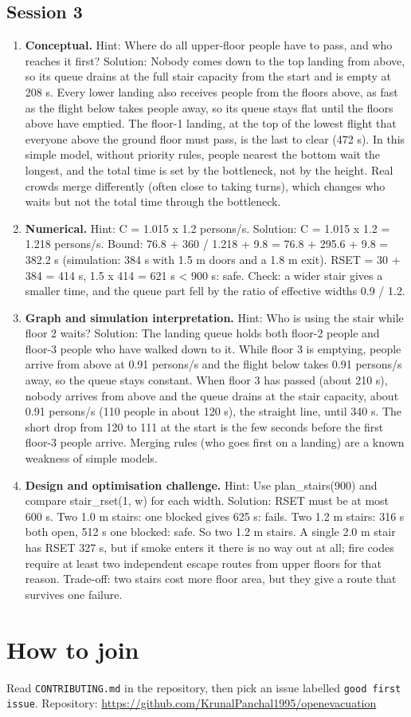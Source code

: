 \documentclass[11pt,a4paper]{article}
\begin{document}
\subsection*{Session 3}
\begin{enumerate}[nosep]
\item \textbf{Conceptual.} Hint: Where do all upper-floor people have to pass, and who reaches it first? Solution: Nobody comes down to the top landing from above, so its queue drains at the full stair capacity from the start and is empty at 208 s. Every lower landing also receives people from the floors above, as fast as the flight below takes people away, so its queue stays flat until the floors above have emptied. The floor-1 landing, at the top of the lowest flight that everyone above the ground floor must pass, is the last to clear (472 s). In this simple model, without priority rules, people nearest the bottom wait the longest, and the total time is set by the bottleneck, not by the height. Real crowds merge differently (often close to taking turns), which changes who waits but not the total time through the bottleneck.
\item \textbf{Numerical.} Hint: C = 1.015 x 1.2 persons/s. Solution: C = 1.015 x 1.2 = 1.218 persons/s. Bound: 76.8 + 360 / 1.218 + 9.8 = 76.8 + 295.6 + 9.8 = 382.2 s (simulation: 384 s with 1.5 m doors and a 1.8 m exit). RSET = 30 + 384 = 414 s, 1.5 x 414 = 621 s < 900 s: safe. Check: a wider stair gives a smaller time, and the queue part fell by the ratio of effective widths 0.9 / 1.2.
\item \textbf{Graph and simulation interpretation.} Hint: Who is using the stair while floor 2 waits? Solution: The landing queue holds both floor-2 people and floor-3 people who have walked down to it. While floor 3 is emptying, people arrive from above at 0.91 persons/s and the flight below takes 0.91 persons/s away, so the queue stays constant. When floor 3 has passed (about 210 s), nobody arrives from above and the queue drains at the stair capacity, about 0.91 persons/s (110 people in about 120 s), the straight line, until 340 s. The short drop from 120 to 111 at the start is the few seconds before the first floor-3 people arrive. Merging rules (who goes first on a landing) are a known weakness of simple models.
\item \textbf{Design and optimisation challenge.} Hint: Use plan\_stairs(900) and compare stair\_rset(1, w) for each width. Solution: RSET must be at most 600 s. Two 1.0 m stairs: one blocked gives 625 s: fails. Two 1.2 m stairs: 316 s both open, 512 s one blocked: safe. So two 1.2 m stairs. A single 2.0 m stair has RSET 327 s, but if smoke enters it there is no way out at all; fire codes require at least two independent escape routes from upper floors for that reason. Trade-off: two stairs cost more floor area, but they give a route that survives one failure.
\end{enumerate}

\section{How to join}
Read \texttt{CONTRIBUTING.md} in the repository, then pick an issue labelled \texttt{good first issue}. Repository: \url{https://github.com/KrunalPanchal1995/openevacuation}
\end{document}
